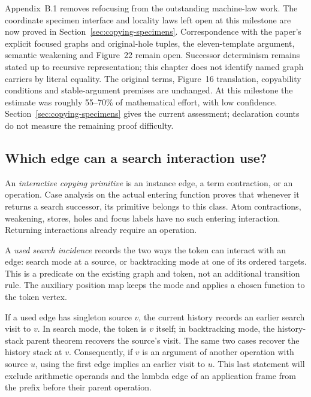 Appendix~B.1 removes refocusing from the outstanding machine-law work. The
coordinate specimen interface and locality laws left open at this milestone
are now proved in Section~\ref{sec:copying-specimens}. Correspondence with the
paper's explicit focused graphs and original-hole tuples, the eleven-template
argument, semantic weakening and Figure~22 remain open. Successor determinism remains stated up
to recursive representation; this chapter does not identify named graph
carriers by literal equality. The original terms, Figure~16 translation,
copyability conditions and stable-argument premises are unchanged.
At this milestone the estimate was roughly 55--70\% of mathematical effort,
with low confidence. Section~\ref{sec:copying-specimens} gives the current
assessment; declaration counts do not measure the remaining proof difficulty.

\subsection{Which edge can a search interaction use?}

An \emph{interactive copying primitive} is an instance edge, a term contraction,
or an operation. Case analysis on the actual entering function proves that
whenever it returns a search successor, its primitive belongs to this class.
Atom contractions, weakening, stores, holes and focus labels have no such
entering interaction. Returning interactions already require an operation.



A \emph{used search incidence} records the two ways the token can interact with
an edge: search mode at a source, or backtracking mode at one of its ordered
targets. This is a predicate on the existing graph and token, not an additional
transition rule. The auxiliary position map keeps the mode and applies a
chosen function to the token vertex.



If a used edge has singleton source $v$, the current history records an
earlier search visit to $v$. In search mode, the token is $v$ itself; in
backtracking mode, the history-stack parent theorem recovers the source's
visit. The same two cases recover the history stack at $v$. Consequently,
if $v$ is an argument of another operation with source $u$, using the first
edge implies an earlier visit to $u$. This last statement will exclude
arithmetic operands and the lambda edge of an application frame from the
prefix before their parent operation.

